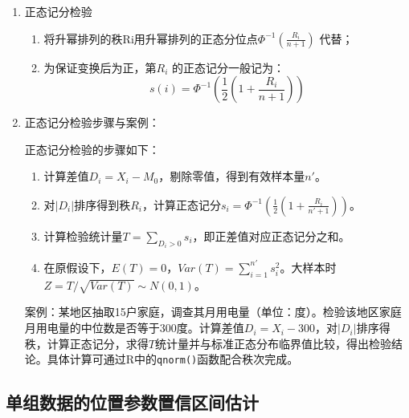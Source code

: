 \documentclass[
]{book}
\providecommand{\tightlist}{%
  \setlength{\itemsep}{0pt}\setlength{\parskip}{0pt}}
\begin{document}
\begin{enumerate}
\def\labelenumi{\arabic{enumi}.}
\item
  正态记分检验

  \begin{enumerate}
  \def\labelenumii{\arabic{enumii}.}
  \tightlist
  \item
    将升幂排列的秩Ri用升幂排列的正态分位点\(\Phi^{-1}(\frac{R_i}{n+1})\) 代替；
  \item
    为保证变换后为正，第\(R_i\) 的正态记分一般记为：\[
    s(i) = \Phi^{-1}(\frac{1}{2}(1+\frac{R_i}{n+1}))
    \]
  \end{enumerate}
\item
  正态记分检验步骤与案例：

  正态记分检验的步骤如下：

  \begin{enumerate}
  \def\labelenumii{\arabic{enumii}.}
  \item
    计算差值\(D_i = X_i - M_0\)，剔除零值，得到有效样本量\(n'\)。
  \item
    对\(|D_i|\)排序得到秩\(R_i\)，计算正态记分\(s_i = \Phi^{-1}\left(\frac{1}{2}\left(1 + \frac{R_i}{n'+1}\right)\right)\)。
  \item
    计算检验统计量\(T = \sum_{D_i > 0} s_i\)，即正差值对应正态记分之和。
  \item
    在原假设下，\(E(T) = 0\)，\(Var(T) = \sum_{i=1}^{n'} s_i^2\)。大样本时\(Z = T / \sqrt{Var(T)} \sim N(0,1)\)。
  \end{enumerate}

  案例：某地区抽取15户家庭，调查其月用电量（单位：度）。检验该地区家庭月用电量的中位数是否等于300度。计算差值\(D_i = X_i - 300\)，对\(|D_i|\)排序得秩，计算正态记分，求得\(T\)统计量并与标准正态分布临界值比较，得出检验结论。具体计算可通过R中的\texttt{qnorm()}函数配合秩次完成。
\end{enumerate}

\subsection{单组数据的位置参数置信区间估计}\label{ux5355ux7ec4ux6570ux636eux7684ux4f4dux7f6eux53c2ux6570ux7f6eux4fe1ux533aux95f4ux4f30ux8ba1}
\end{document}

